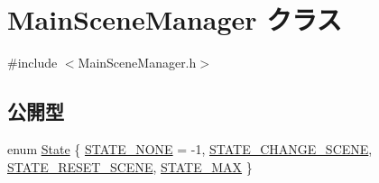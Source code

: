 \hypertarget{class_main_scene_manager}{}\section{Main\+Scene\+Manager クラス}
\label{class_main_scene_manager}


{\ttfamily \#include $<$Main\+Scene\+Manager.\+h$>$}

\subsection*{公開型}
\begin{DoxyCompactItemize}
\item 
enum \mbox{\hyperlink{class_main_scene_manager_aa66c4c2962514285b245950817a3640c}{State}} \{ \mbox{\hyperlink{class_main_scene_manager_aa66c4c2962514285b245950817a3640caba21024b25d7710d4461fba4e00baf4f}{S\+T\+A\+T\+E\+\_\+\+N\+O\+NE}} = -\/1, 
\mbox{\hyperlink{class_main_scene_manager_aa66c4c2962514285b245950817a3640ca39ff93daffebd6b0dff1018e999655b8}{S\+T\+A\+T\+E\+\_\+\+C\+H\+A\+N\+G\+E\+\_\+\+S\+C\+E\+NE}}, 
\mbox{\hyperlink{class_main_scene_manager_aa66c4c2962514285b245950817a3640ca981c2957774dab943dd9e01ba82cdbae}{S\+T\+A\+T\+E\+\_\+\+R\+E\+S\+E\+T\+\_\+\+S\+C\+E\+NE}}, 
\mbox{\hyperlink{class_main_scene_manager_aa66c4c2962514285b245950817a3640cacc0736a554c2e0e081819a411d50f064}{S\+T\+A\+T\+E\+\_\+\+M\+AX}}
 \}
\end{DoxyCompactItemize}
